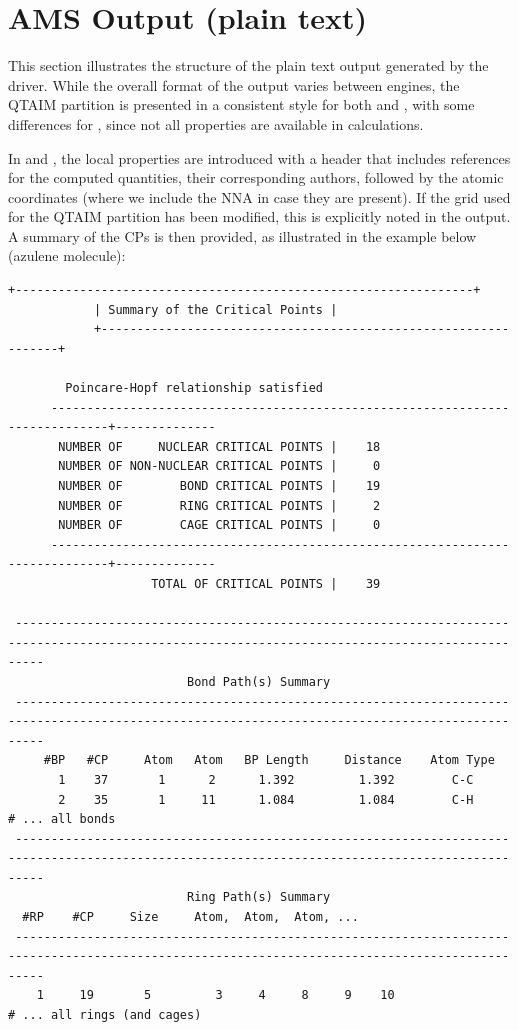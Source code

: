 \newpage
\section{AMS Output (plain text)}\label{output_adf}

This section illustrates the structure of the plain text output generated by
the \ams driver. While the overall format of the output varies between
engines, the \gls{QTAIM} partition is presented in a consistent style for both
\adf and \dftb, with some differences for \band, since not all properties are
available in \band calculations.

In \adf and \dftb, the local properties are introduced with a header that
includes references for the computed quantities, their corresponding authors,
followed by the atomic coordinates (where we include the \gls{NNA} in case they
are present). If the grid used for the \gls{QTAIM} partition has been modified,
this is explicitly noted in the output. A summary of the \glspl{CP} is then
provided, as illustrated in the example below (azulene molecule):

\begin{lstlisting}[language=plain]
            +----------------------------------------------------------------+
            | Summary of the Critical Points |
            +----------------------------------------------------------------+

        Poincare-Hopf relationship satisfied
      ------------------------------------------------------------------------------+--------------
       NUMBER OF     NUCLEAR CRITICAL POINTS |    18
       NUMBER OF NON-NUCLEAR CRITICAL POINTS |     0
       NUMBER OF        BOND CRITICAL POINTS |    19
       NUMBER OF        RING CRITICAL POINTS |     2
       NUMBER OF        CAGE CRITICAL POINTS |     0 
      ------------------------------------------------------------------------------+--------------
                    TOTAL OF CRITICAL POINTS |    39   

 ------------------------------------------------------------------------------------------------------------------------------------------------
                         Bond Path(s) Summary
 ------------------------------------------------------------------------------------------------------------------------------------------------
     #BP   #CP     Atom   Atom   BP Length     Distance    Atom Type 
       1    37       1      2      1.392         1.392        C-C  
       2    35       1     11      1.084         1.084        C-H
# ... all bonds
 ------------------------------------------------------------------------------------------------------------------------------------------------
                         Ring Path(s) Summary
  #RP    #CP     Size     Atom,  Atom,  Atom, ...
 ------------------------------------------------------------------------------------------------------------------------------------------------
    1     19       5         3     4     8     9    10
# ... all rings (and cages)
\end{lstlisting}

